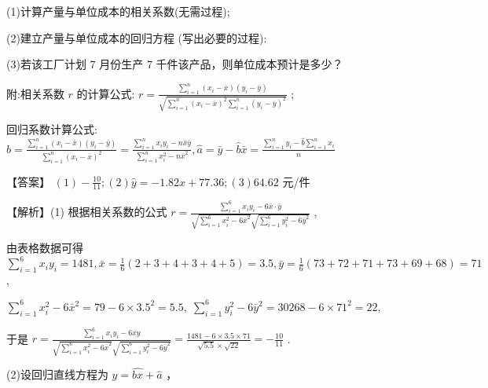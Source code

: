 \documentclass[10pt]{article}
\begin{document}
(1)计算产量与单位成本的相关系数(无需过程);

(2)建立产量与单位成本的回归方程 (写出必要的过程):

(3)若该工厂计划 7 月份生产 7 千件该产品，则单位成本预计是多少？

附:相关系数 \(r\) 的计算公式: \(r = \frac{\mathop{\sum }\limits_{{i = 1}}^{n}\left( {{x}_{i} - \overline{x}}\right) \left( {{y}_{i} - \overline{y}}\right) }{\sqrt{\mathop{\sum }\limits_{{i = 1}}^{n}{\left( {x}_{i} - \overline{x}\right) }^{2}\mathop{\sum }\limits_{{i = 1}}^{n}{\left( {y}_{i} - \overline{y}\right) }^{2}}}\) ;

回归系数计算公式: \(\widehat{b} = \frac{\mathop{\sum }\limits_{{i = 1}}^{n}\left( {{x}_{i} - \bar{x}}\right) \left( {{y}_{i} - \bar{y}}\right) }{\mathop{\sum }\limits_{{i = 1}}^{n}{\left( {x}_{i} - \bar{x}\right) }^{2}} = \frac{\mathop{\sum }\limits_{{i = 1}}^{n}{x}_{i}{y}_{i} - n\bar{x}\bar{y}}{\mathop{\sum }\limits_{{i = 1}}^{n}{x}_{i}^{2} - n{\bar{x}}^{2}},\widehat{a} = \bar{y} - \widehat{b}\bar{x} = \frac{\mathop{\sum }\limits_{{i = 1}}^{n}{y}_{i} - \widehat{b}\mathop{\sum }\limits_{{i = 1}}^{n}{x}_{i}}{n}\)

【答案】 \(\left( 1\right)  - \frac{10}{11};\left( 2\right) \widehat{y} =  - {1.82x} + {77.36};\left( 3\right) {64.62}\) 元/件

【解析】(1) 根据相关系数的公式 \(r = \frac{\mathop{\sum }\limits_{{i = 1}}^{6}{x}_{i}{y}_{i} - 6\bar{x} \cdot  \bar{y}}{\sqrt{\mathop{\sum }\limits_{{i = 1}}^{6}{x}_{i}^{2} - 6{\bar{x}}^{2}}\sqrt{\mathop{\sum }\limits_{{i = 1}}^{6}{y}_{i}^{2} - 6{\bar{y}}^{2}}}\) ,

由表格数据可得 \(\mathop{\sum }\limits_{{i = 1}}^{6}{x}_{i}{y}_{i} = {1481},\bar{x} = \frac{1}{6}\left( {2 + 3 + 4 + 3 + 4 + 5}\right)  = {3.5},\bar{y} = \frac{1}{6}\left( {{73} + {72} + {71} + {73} + {69} + {68}}\right)  = {71}\) ,

\(\mathop{\sum }\limits_{{i = 1}}^{6}{x}_{i}^{2} - 6{\bar{x}}^{2} = {79} - 6 \times  {3.5}^{2} = {5.5},\;\mathop{\sum }\limits_{{i = 1}}^{6}{y}_{i}^{2} - 6{\bar{y}}^{2} = {30268} - 6 \times  {71}^{2} = {22},\)

于是 \(r = \frac{\mathop{\sum }\limits_{{i = 1}}^{6}{x}_{i}{y}_{i} - 6\overline{xy}}{\sqrt{\mathop{\sum }\limits_{{i = 1}}^{6}{x}_{i}^{2} - 6{\bar{x}}^{2}}\sqrt{\mathop{\sum }\limits_{{i = 1}}^{6}{y}_{i}^{2} - 6{\bar{y}}^{2}}} = \frac{{1481} - 6 \times  {3.5} \times  {71}}{\sqrt{5.5} \times  \sqrt{22}} =  - \frac{10}{11}\) .

(2)设回归直线方程为 \(\widehat{y} = \widehat{bx} + \widehat{a}\) ，
\end{document}
